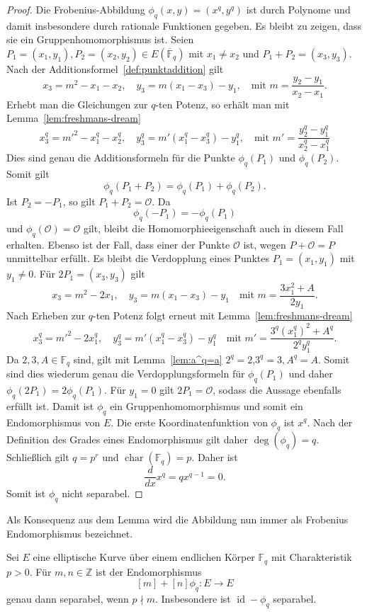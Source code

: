 \begin{proof}
    Die Frobenius-Abbildung $\phi_q(x,y) = (x^q, y^q)$ ist durch Polynome und damit insbesondere durch rationale Funktionen gegeben. Es bleibt zu zeigen, dass sie ein Gruppenhomomorphismus ist. Seien $P_1=(x_1,y_1),P_2=(x_2,y_2)\in E(\overline{\mathbb{F}}_q)$ mit $x_1\neq x_2$ und $P_1+P_2=(x_3,y_3)$. Nach der Additionsformel~\ref{def:punktaddition} gilt
    \[
        x_3=m^2-x_1-x_2,\quad y_3=m(x_1-x_3)-y_1, \quad \text{mit } m=\frac{y_2-y_1}{x_2-x_1}.
    \]
    Erhebt man die Gleichungen zur $q$-ten Potenz, so erhält man mit Lemma~\ref{lem:freshmans-dream}
    \[
        x_3^q={m'}^2-x_1^q-x_2^q,\quad y_3^q=m'(x_1^q-x_3^q)-y_1^q, \quad \text{mit } m'=\frac{y_2^q-y_1^q}{x_2^q-x_1^q}
    \]
    Dies sind genau die Additionsformeln für die Punkte
    $\phi_q(P_1)$ und $\phi_q(P_2)$. Somit gilt
    \[
        \phi_q(P_1+P_2)
        =
        \phi_q(P_1)+\phi_q(P_2).
    \]
    Ist $P_2=-P_1$, so gilt $P_1+P_2=\mathcal O$.
    Da
    \[
        \phi_q(-P_1)=-\phi_q(P_1)
    \]
    und $\phi_q(\mathcal O)=\mathcal O$ gilt, bleibt die Homomorphieeigenschaft auch in diesem Fall erhalten. Ebenso ist der Fall, dass einer der Punkte $\mathcal O$ ist, wegen $P+\mathcal O=P$ unmittelbar erfüllt. Es bleibt die Verdopplung eines Punktes $P_1=(x_1,y_1)$ mit $y_1\neq0$. Für \(2P_1=(x_3,y_3)\) gilt
    \[
        x_3=m^2-2x_1,\quad y_3=m(x_1-x_3)-y_1\quad \text{mit } m=\frac{3x_1^2+A}{2y_1}.
    \]
    Nach Erheben zur $q$-ten Potenz folgt erneut mit Lemma~\ref{lem:freshmans-dream}
    \[
        x_3^q={m'}^2-2x_1^q,\quad y_3^q=m'(x_1^q-x_3^q)-y_1^q\quad \text{mit } m'=\frac{3^q{(x_1^q)}^2+A^q}{2^q y_1^q}.
    \]
    Da $2,3,A\in\mathbb{F}_q$ sind, gilt mit Lemma~\ref{lem:a^q=a} $2^q=2$,$3^q=3, A^q=A$. Somit sind dies wiederum genau die Verdopplungsformeln für
    $\phi_q(P_1)$ und daher \(\phi_q(2P_1)=2\phi_q(P_1)\).  Für $y_1=0$ gilt $2P_1=\mathcal O$, sodass die Aussage ebenfalls erfüllt ist.  Damit ist $\phi_q$ ein Gruppenhomomorphismus und somit ein Endomorphismus von $E$.
    Die erste Koordinatenfunktion von $\phi_q$ ist $x^q$.
    Nach der Definition des Grades eines Endomorphismus gilt daher \(\deg(\phi_q)=q\). Schließlich gilt $q=p^r$ und $\operatorname{char}(\mathbb F_q)=p$. Daher ist
    \[
        \frac{d}{dx}x^q
        =
        qx^{q-1}
        =
        0.
    \]
    Somit ist $\phi_q$ nicht separabel.
\end{proof}
\begin{bemerkung}
    Als Konsequenz aus dem Lemma wird die Abbildung nun immer als Frobenius Endomorphismus bezeichnet.
\end{bemerkung}
\begin{corollary}\label{korr:abbildung-separabel}
    Sei $E$ eine elliptische Kurve über einem endlichen Körper $\mathbb{F}_q$ mit Charakteristik $p>0$.  Für $m,n\in\mathbb Z$ ist der Endomorphismus
    \[
        [m]+[n]\phi_q:E\to E
    \]
    genau dann separabel, wenn $p \nmid m$. Insbesondere ist $\operatorname{id}-\phi_q$ separabel.
\end{corollary}

